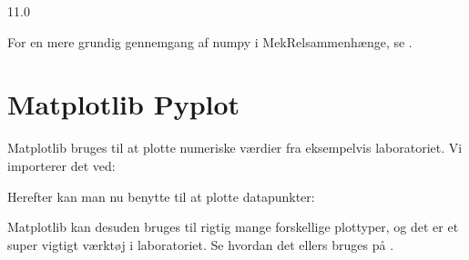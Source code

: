\documentclass[letterpaper,10pt,english]{jupyterBook}
\begin{document}
\begin{sphinxVerbatim}[commandchars=\\\{\}]
11.0
\end{sphinxVerbatim}

For en mere grundig gennemgang af numpy i MekRel\sphinxhyphen{}sammenhænge, se {\hyperref[\detokenize{notebooks/MekRel/Numpy::doc}]{}}.


\section{Matplotlib Pyplot}
\label{\detokenize{notebooks/Intro_til_pakker:matplotlib-pyplot}}
Matplotlib bruges til at plotte numeriske værdier fra eksempelvis laboratoriet. Vi importerer det ved:

\begin{sphinxVerbatim}[commandchars=\\\{\}]
   
\end{sphinxVerbatim}

Herefter kan man nu benytte  til at plotte datapunkter:

\begin{sphinxVerbatim}[commandchars=\\\{\}]
  \PYG{p}{[}    \PYG{p}{]}
  

  
\end{sphinxVerbatim}

\noindent{}

Matplotlib kan desuden bruges til rigtig mange forskellige plottyper, og det er et super vigtigt værktøj i laboratoriet. Se hvordan det ellers bruges på {\hyperref[\detokenize{notebooks/MekRel/Matplotlib_pyplot::doc}]{}}.
\end{document}
